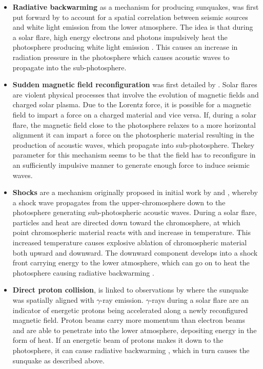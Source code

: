 \begin{itemize}
\item \textbf{Radiative backwarming} as a mechanism for producing sunquakes, was first put forward by \cite{2005ApJ...630.1168D} to account for a spatial correlation between seismic sources and white light emission from the lower atmosphere. The idea is that during a solar flare, high energy electrons and photons impulsively heat the photosphere producing white light emission \citep{1989SoPh..124..303M}. This causes an increase in radiation pressure in the photosphere which causes acoustic waves to propagate into the sub-photosphere. \\
     
\item \textbf{Sudden magnetic field reconfiguration} was first detailed by \cite{2008ASPC..383..221H}. Solar flares are violent physical processes that involve the evolution of magnetic fields and charged solar plasma. Due to the Lorentz force, it is possible for a magnetic field to impart a force on a charged material and vice versa. If, during a solar flare, the magnetic field close to the photosphere relaxes to a more horizontal alignment it can impart a force on the photospheric material resulting in the production of acoustic waves, which propagate into sub-photosphere. Thekey parameter for this mechanism seems to be that the field has to reconfigure in an sufficiently impulsive manner to generate enough force to induce seismic waves. \\

\item \textbf{Shocks} are a mechanism originally proposed in initial work by \cite{1995ESASP.376b.341K} and \cite{1998Natur.393..317K}, whereby a shock wave propagates from the upper-chromosphere down to the photosphere generating sub-photospheric acoustic waves. During a solar flare, particles and heat are directed down toward the chromosphere, at which point chromospheric material reacts with and increase in temperature. This increased temperature causes explosive ablation of chromospheric material both upward and downward. The downward component develops into a shock front carrying energy to the lower atmosphere, which can go on to heat the photosphere causing radiative backwarming \citep{1989SoPh..124..303M}. \\

\item \textbf{Direct proton collision}, is linked to observations by \cite{2007ApJ...664..573Z} where the sunquake was spatially aligned with $\gamma$-ray emission. $\gamma$-rays during a solar flare are an indicator of energetic protons being accelerated along a newly reconfigured magnetic field. Proton beams carry more momentum than electron beams and are able to penetrate into the lower atmosphere, depositing energy in the form of heat. If an energetic beam of protons makes it down to the photosphere, it can cause radiative backwarming \citep{1989SoPh..124..303M}, which in turn causes the sunquake as described above. \\

\end{itemize}




